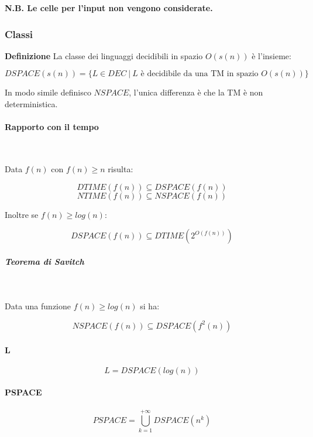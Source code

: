 \documentclass{article}
\begin{document}
\noindent \textbf{N.B. Le celle per l'input non vengono considerate.}\newline

\subsubsection{Classi}

\noindent\textbf{Definizione} La classe dei linguaggi decidibili in spazio $O(s(n))$ è l'insieme:

$$DSPACE(s(n))=\{L\in DEC\ |\ L\text{ è decidibile da una TM in spazio }O(s(n))\}$$\newline

\noindent In modo simile definisco $NSPACE$, l'unica differenza è che la TM è non deterministica.

\paragraph{Rapporto con il tempo} $\ $\newline

\noindent Data $f(n)$ con $f(n)\geq n$ risulta:

$$DTIME(f(n))\subseteq DSPACE(f(n))$$
$$NTIME(f(n))\subseteq NSPACE(f(n))$$\newline

\noindent Inoltre se $f(n)\geq log(n)$:

$$DSPACE(f(n))\subseteq DTIME(2^{O(f(n))})$$\newline 

\subparagraph{Teorema di Savitch} $\ $\newline

Data una funzione $f(n)\geq log(n)$ si ha:

$$NSPACE(f(n))\subseteq DSPACE(f^2(n))$$\newline

\paragraph{L}

$$L=DSPACE(log(n))$$\newline

\paragraph{PSPACE}

$$PSPACE=\bigcup_{k=1}^{+\infty}DSPACE(n^k)$$\newline
\end{document}
